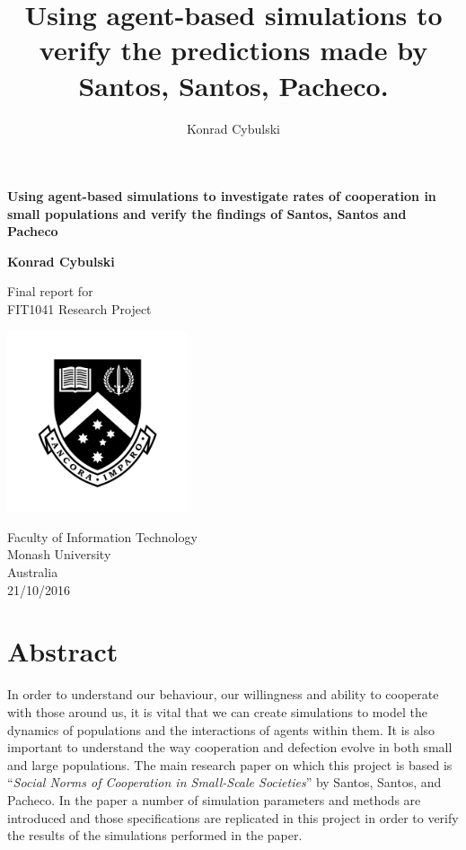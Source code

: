\documentclass[10pt,a4paper]{article}
\author{Konrad Cybulski}
\title{Using agent-based simulations to verify the predictions made by Santos, Santos, Pacheco.}
\begin{document}
\begin{titlepage}
    \begin{center}
        \vspace*{1cm}
        
        \LARGE
        \textbf{Using agent-based simulations to investigate rates of cooperation in small populations and verify the findings of Santos, Santos and Pacheco}
        
        \vspace{2cm}
        \Large
        
        \textbf{Konrad Cybulski}
        
        \vfill
        
        Final report for\\
        FIT1041 Research Project
        
        \vspace{0.8cm}
        
        \includegraphics[width=0.4\textwidth]{Images/monash_emblem.jpg}
        
        \large
        Faculty of Information Technology\\
        Monash University\\
        Australia\\
        21/10/2016
        
    \end{center}
\end{titlepage}

\begin{Large}

\end{Large}

\pagebreak
\tableofcontents
\pagebreak

\section{Abstract}
In order to understand our behaviour, our willingness and ability to cooperate with those around us, it is vital that we can create simulations to model the dynamics of populations and the interactions of agents within them.
It is also important to understand the way cooperation and defection evolve in both small and large populations.
The main research paper on which this project is based is “\textit{Social Norms of Cooperation in Small-Scale Societies}” by Santos, Santos, and Pacheco. 
In the paper a number of simulation parameters and methods are introduced and those specifications are replicated in this project in order to verify the results of the simulations performed in the paper.
\end{document}
